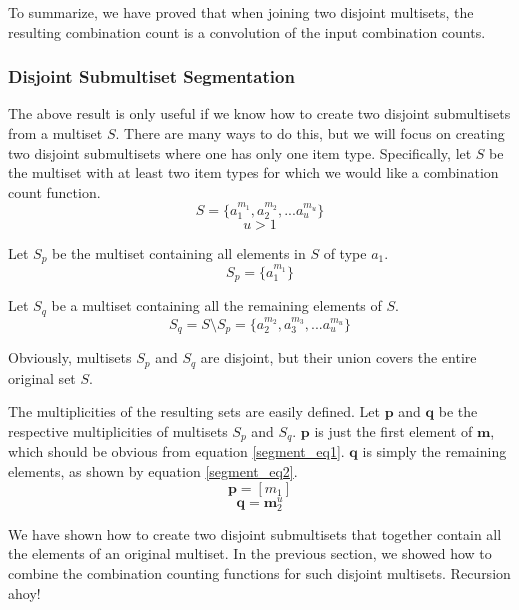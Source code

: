 \documentclass{article}
\begin{document}
To summarize, we have proved that when joining two disjoint multisets, the resulting combination count is a convolution of the input combination counts.

\subsubsection{Disjoint Submultiset Segmentation} \label{segment}

The above result is only useful if we know how to create two disjoint submultisets from a multiset $S$. There are many ways to do this, but we will focus on creating two disjoint submultisets where one has only one item type. Specifically, let $S$ be the multiset with at least two item types for which we would like a combination count function. 
\begin{equation}
    S = \{a_1^{m_1}, a_2^{m_2}, ... a_u^{m_u}\}
\end{equation}
\begin{equation}
    u>1
\end{equation}

Let $S_p$ be the multiset containing all elements in $S$ of type $a_1$.
\begin{equation} \label{segment_eq1}
    S_p = \{a_1^{m_1}\}
\end{equation}

Let $S_q$ be a multiset containing all the remaining elements of $S$.
\begin{equation}\label{segment_eq2}
    S_q = S \setminus S_p = \{a_2^{m_2}, a_3^{m_3}, ... a_u^{m_u}\}
\end{equation}

Obviously, multisets $S_p$ and $S_q$ are disjoint, but their union covers the entire original set $S$.

The multiplicities of the resulting sets are easily defined. Let $\bm{p}$ and $\bm{q}$ be the respective multiplicities of multisets $S_p$ and $S_q$. $\bm{p}$ is just the first element of $\bm{m}$, which should be obvious from equation \ref{segment_eq1}. $\bm{q}$ is simply the remaining elements, as shown by equation \ref{segment_eq2}.
\begin{equation}
    \bm{p} = [m_1]
\end{equation}
\begin{equation}
    \bm{q} = \bm{m}_2^u
\end{equation}

We have shown how to create two disjoint submultisets that together contain all the elements of an original multiset. In the previous section, we showed how to combine the combination counting functions for such disjoint multisets. Recursion ahoy!
\end{document}
